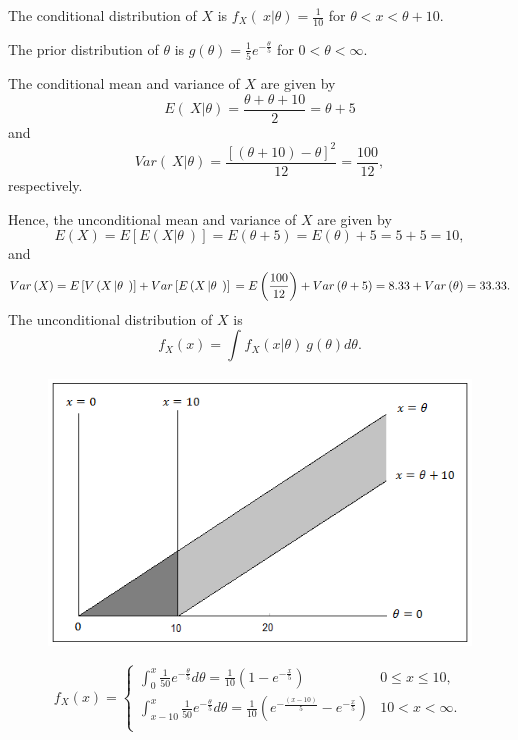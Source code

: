 \documentclass[]{book}
\begin{document}
The conditional distribution of \(X\) is
\(f_{X}\left( \left. \ x \right|\theta \right) = \frac{1}{10}\) for
\(\theta < x < \theta + 10\).

The prior distribution of \(\theta\) is
\(g\left( \theta \right) = \frac{1}{5}e^{- \frac{\theta}{5}}\) for
\(0 < \theta < \infty\).

The conditional mean and variance of \(X\) are given by
\[E\left( \left. \ X \right|\theta \right) = \frac{\theta + \theta + 10}{2} = \theta + 5\]
and
\[Var\left( \left. \ X \right|\theta \right) = \frac{\left\lbrack \left( \theta + 10 \right) - \theta \right\rbrack^{2}}{12} = \frac{100}{12}, \]
respectively.

Hence, the unconditional mean and variance of \(X\) are given by
\[E\left( X \right) = E\left\lbrack E\left( X\left| \theta \right.\  \right) \right\rbrack = E\left( \theta + 5 \right) = E\left( \theta \right) + 5 = 5 + 5 = 10,\]
and
\[Var\left( X \right) = E\left\lbrack V\left( X\left| \theta \right.\  \right) \right\rbrack + Var\left\lbrack E\left( X\left| \theta \right.\  \right) \right\rbrack \\
= E\left( \frac{100}{12} \right) + Var\left( \theta + 5 \right) = 8.33 + Var\left( \theta \right) = 33.33. \]
The unconditional distribution of \(X\) is
\[f_{X}\left( x \right) = \int_{}^{}{f_{X}\left( x |\theta \right) ~g\left( \theta \right) d \theta} .\]

\begin{figure}
\centering
\includegraphics{Figures/Fig3Exer.png}
\caption{}
\end{figure}

\[f_{X}\left( x \right) = \left\{ \begin{matrix}
\int_{0}^{x}{\frac{1}{50}e^{- \frac{\theta}{5}}d\theta = \frac{1}{10}\left( 1 - e^{- \frac{x}{5}} \right)} & 0 \leq x \leq 10, \\
\int_{x - 10}^{x}{\frac{1}{50}e^{- \frac{\theta}{5}} d\theta} = \frac{1}{10}\left( e^{- \frac{\left( x - 10 \right)}{5}} - e^{- \frac{x}{5}} \right) & 10 < x < \infty. \\
\end{matrix} \right.\ \]
\end{document}
